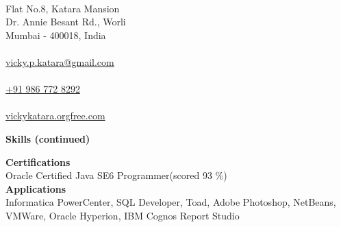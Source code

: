 \documentclass[a4paper,12pt,final]{memoir}
\newcommand{\Sep}{\vspace{1.5em}}
\newcommand{\SmallSep}{\vspace{0.5em}}
\newcommand{\CVSection}[1]
	{\Large\textbf{#1}\par
	\SmallSep\normalsize\normalfont}
\newcommand{\CVItem}[1]
	{\textbf{\color{Plum} #1}}
\begin{document}

\begin{flushright} 
	\footnotesize
	\SmallSep
	{\bfseries{\color{Plum}{Address}}}\\
	
	Flat No.8, Katara Mansion\\
	Dr. Annie Besant Rd., Worli\\
	Mumbai - 400018, India\\
	\Sep
	{\bfseries{\color{Plum}{EMail}}}\\
	\href{mailto:vicky.p.katara@gmail.com}{vicky.p.katara@gmail.com}\\
	\Sep
	{\bfseries{\color{Plum}{Cellphone}}}\\
	\href{tel:+919867728292}{+91 986 772 8292}\\
	\Sep
		{\bfseries{\color{Plum}{Website}}}\\
	\href{http://vickykatara.orgfree.com/}{vickykatara.orgfree.com}\\
\end{flushright}\normalsize
	\hspace{0.5cm}
	\vspace{-0.35cm}
	\vspace{-0.1cm}
	\hspace{-0.4cm}
\framebreak

\CVSection{Skills (continued)}
\CVItem{Certifications}\\
{\footnotesize Oracle Certified Java SE6 Programmer(scored 93 \%)}\\
\CVItem{Applications}\\
{\footnotesize Informatica PowerCenter, SQL Developer, Toad, Adobe Photoshop, NetBeans, VMWare, Oracle Hyperion, IBM Cognos Report Studio}
\SmallSep
\end{document}
